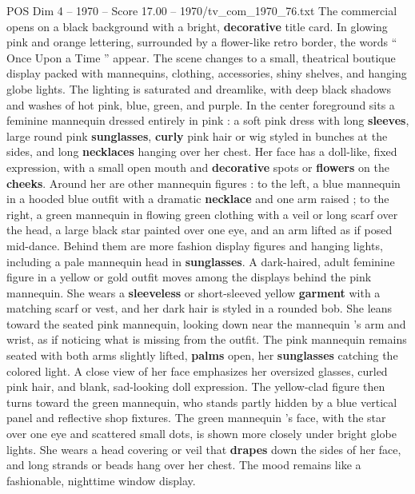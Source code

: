 \begin{textsample}{POS Dim 4 – 1970 – Score 17.00 – 1970/tv\_com\_1970\_76.txt}  \label{ex:f4_pos_082}
The commercial opens on a black background with a bright, \textbf{decorative} title card.
In glowing pink and orange lettering, surrounded by a flower-like retro border, the words “ Once Upon a Time ” appear.
The scene changes to a small, theatrical boutique display packed with mannequins, clothing, accessories, shiny shelves, and hanging globe lights.
The lighting is saturated and dreamlike, with deep black shadows and washes of hot pink, blue, green, and purple.
In the center foreground sits a feminine mannequin dressed entirely in pink : a soft pink dress with long \textbf{sleeves}, large round pink \textbf{sunglasses}, \textbf{curly} pink hair or wig styled in bunches at the sides, and long \textbf{necklaces} hanging over her chest.
Her face has a doll-like, fixed expression, with a small open mouth and \textbf{decorative} spots or \textbf{flowers} on the \textbf{cheeks}.
Around her are other mannequin figures : to the left, a blue mannequin in a hooded blue outfit with a dramatic \textbf{necklace} and one arm raised ; to the right, a green mannequin in flowing green clothing with a veil or long scarf over the head, a large black star painted over one eye, and an arm lifted as if posed mid-dance.
Behind them are more fashion display figures and hanging lights, including a pale mannequin head in \textbf{sunglasses}.
A dark-haired, adult feminine figure in a yellow or gold outfit moves among the displays behind the pink mannequin.
She wears a \textbf{sleeveless} or short-sleeved yellow \textbf{garment} with a matching scarf or vest, and her dark hair is styled in a rounded bob.
She leans toward the seated pink mannequin, looking down near the mannequin ’s arm and wrist, as if noticing what is missing from the outfit.
The pink mannequin remains seated with both arms slightly lifted, \textbf{palms} open, her \textbf{sunglasses} catching the colored light.
A close view of her face emphasizes her oversized glasses, curled pink hair, and blank, sad-looking doll expression.
The yellow-clad figure then turns toward the green mannequin, who stands partly hidden by a blue vertical panel and reflective shop fixtures.
The green mannequin ’s face, with the star over one eye and scattered small dots, is shown more closely under bright globe lights.
She wears a head covering or veil that \textbf{drapes} down the sides of her face, and long strands or beads hang over her chest.
The mood remains like a fashionable, nighttime window display.

\end{textsample}
